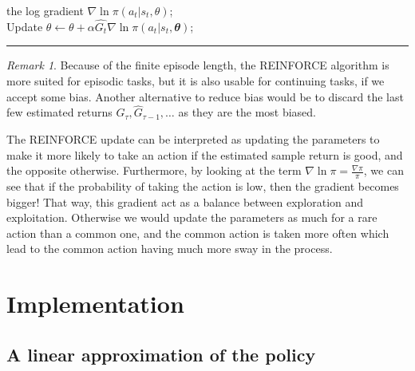 \documentclass[
  letterpaper,
]{report}
\theoremstyle{plain}
\theoremstyle{definition}
\theoremstyle{definition}
\theoremstyle{remark}
\newtheorem*{remark}{Remark}
\begin{document}
the log gradient \(\nabla \ln \pi(a_t|s_t,\theta)\);\\
\hspace*{0.333em}\hspace*{0.333em}\hspace*{0.333em}\hspace*{0.333em}\hspace*{0.333em}\hspace*{0.333em}\hspace*{0.333em}\hspace*{0.333em}\hspace*{0.333em}\hspace*{0.333em}Update
\(\theta \leftarrow \theta + \alpha \hat{G_t} \nabla \ln \pi(a_t|s_t,\mathbfit{\theta})\);\\

\begin{center}\rule{0.5\linewidth}{0.5pt}\end{center}

\begin{remark}

Because of the finite episode length, the REINFORCE algorithm is more
suited for episodic tasks, but it is also usable for continuing tasks,
if we accept some bias. Another alternative to reduce bias would be to
discard the last few estimated returns
\(\hat{G}_\tau, \hat{G}_{\tau-1}, \dots\) as they are the most biased.

\end{remark}

The REINFORCE update can be interpreted as updating the parameters to
make it more likely to take an action if the estimated sample return is
good, and the opposite otherwise. Furthermore, by looking at the term
\(\nabla \ln \pi = \frac{\nabla \pi}{\pi}\), we can see that if the
probability of taking the action is low, then the gradient becomes
bigger! That way, this gradient act as a balance between exploration and
exploitation. Otherwise we would update the parameters as much for a
rare action than a common one, and the common action is taken more often
which lead to the common action having much more sway in the process.


\hypertarget{implementation}{%
\chapter{Implementation}\label{implementation}}

\hypertarget{sec-linear_policy}{%
\section{A linear approximation of the policy}\label{sec-linear_policy}}
\end{document}
